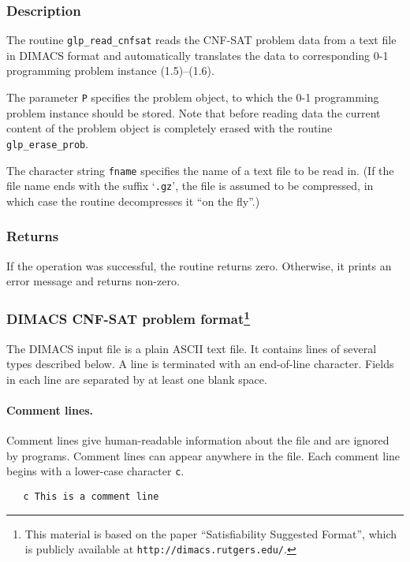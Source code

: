 \documentclass[11pt,draft]{article}
\begin{document}
\subsubsection*{Description}

The routine \verb|glp_read_cnfsat| reads the CNF-SAT problem data from
a text file in DIMACS format and automatically translates the data to
corresponding 0-1 programming problem instance (1.5)--(1.6).

The parameter \verb|P| specifies the problem object, to which the
0-1 programming problem instance should be stored. Note that before
reading data the current content of the problem object is completely
erased with the routine \verb|glp_erase_prob|.

The character string \verb|fname| specifies the name of a text file
to be read in. (If the file name ends with the suffix `\verb|.gz|',
the file is assumed to be compressed, in which case the routine
decompresses it ``on the fly''.)

\subsubsection*{Returns}

If the operation was successful, the routine returns zero. Otherwise,
it prints an error message and returns non-zero.

\subsubsection*{DIMACS CNF-SAT problem format\footnote{This material
is based on the paper ``Satisfiability Suggested Format'', which is
publicly available at {\tt http://dimacs.rutgers.edu/}.}}

The DIMACS input file is a plain ASCII text file. It contains lines of
several types described below. A line is terminated with an end-of-line
character. Fields in each line are separated by at least one blank
space.

\paragraph{Comment lines.} Comment lines give human-readable
information about the file and are ignored by programs. Comment lines
can appear anywhere in the file. Each comment line begins with a
lower-case character \verb|c|.

\begin{verbatim}
   c This is a comment line
\end{verbatim}
\end{document}
